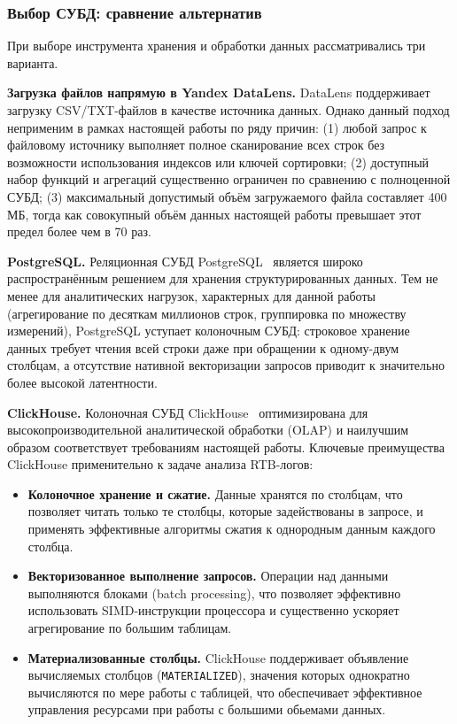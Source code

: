 \subsubsection*{Выбор СУБД: сравнение альтернатив}

При выборе инструмента хранения и обработки данных рассматривались три варианта.

\textbf{Загрузка файлов напрямую в Yandex DataLens.} DataLens поддерживает загрузку CSV/TXT-файлов в качестве источника данных. Однако данный подход неприменим в рамках настоящей работы по ряду причин: (1) любой запрос к файловому источнику выполняет полное сканирование всех строк без возможности использования индексов или ключей сортировки; (2) доступный набор функций и агрегаций существенно ограничен по сравнению с полноценной СУБД; (3) максимальный допустимый объём загружаемого файла составляет 400 МБ, тогда как совокупный объём данных настоящей работы превышает этот предел более чем в 70 раз.

\textbf{PostgreSQL.} Реляционная СУБД PostgreSQL~\cite{postgresql} является широко распространённым решением для хранения структурированных данных. Тем не менее для аналитических нагрузок, характерных для данной работы (агрегирование по десяткам миллионов строк, группировка по множеству измерений), PostgreSQL уступает колоночным СУБД: строковое хранение данных требует чтения всей строки даже при обращении к одному-двум столбцам, а отсутствие нативной векторизации запросов приводит к значительно более высокой латентности.

\textbf{ClickHouse.} Колоночная СУБД ClickHouse~\cite{clickhouse} оптимизирована для высокопроизводительной аналитической обработки (OLAP) и наилучшим образом соответствует требованиям настоящей работы. Ключевые преимущества ClickHouse применительно к задаче анализа RTB-логов:

\begin{itemize}
    \item \textbf{Колоночное хранение и сжатие.} Данные хранятся по столбцам, что позволяет читать только те столбцы, которые задействованы в запросе, и применять эффективные алгоритмы сжатия к однородным данным каждого столбца.
    \item \textbf{Векторизованное выполнение запросов.} Операции над данными выполняются блоками (batch processing), что позволяет эффективно использовать SIMD-инструкции процессора и существенно ускоряет агрегирование по большим таблицам.
    \item \textbf{Материализованные столбцы.} ClickHouse поддерживает объявление вычисляемых столбцов (\texttt{MATERIALIZED}), значения которых однократно вычисляются по мере работы с таблицей, что обеспечивает эффективное управления ресурсами при работы с большими обьемами данных.
\end{itemize}

